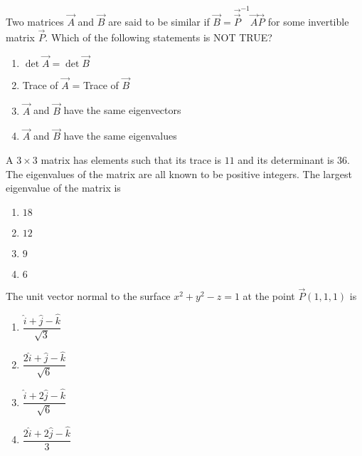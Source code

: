 \item Two matrices $\vec{A}$ and $\vec{B}$ are said to be similar if $\vec{B} = \vec{\vec{P}}^{-1} \vec{A} \vec{P}$ for some invertible matrix $\vec{P}$. Which of the following statements is {NOT TRUE}?
\hfill{}
\begin{multicols}{2}
\begin{enumerate}
    \item $\det \vec{A} = \det \vec{B}$
    \item Trace of $\vec{A}$ = Trace of $\vec{B}$
    \item $\vec{A}$ and $\vec{B}$ have the same eigenvectors
    \item $\vec{A}$ and $\vec{B}$ have the same eigenvalues
\end{enumerate}
\end{multicols}
\item A $3 \times 3$ matrix has elements such that its trace is $11$ and its determinant is $36$. The eigenvalues of the matrix are all known to be positive integers. The largest eigenvalue of the matrix is
\hfill{}
\begin{multicols}{4}
\begin{enumerate}
    \item $18$
    \item $12$
    \item $9$
    \item $6$
\end{enumerate}
\end{multicols}
\item The unit vector normal to the surface $x^{2} + y^{2} - z = 1$ at the point $\vec{P}(1,1,1)$ is 
\hfill{}
\begin{multicols}{4}
\begin{enumerate}
    \item $\dfrac{\hat{i} + \hat{j} - \hat{k}}{\sqrt{3}}$
    \item $\dfrac{2\hat{i} + \hat{j} - \hat{k}}{\sqrt{6}}$
    \item $\dfrac{\hat{i} + 2\hat{j} - \hat{k}}{\sqrt{6}}$
    \item $\dfrac{2\hat{i} + 2\hat{j} - \hat{k}}{3}$
\end{enumerate}
\end{multicols}
